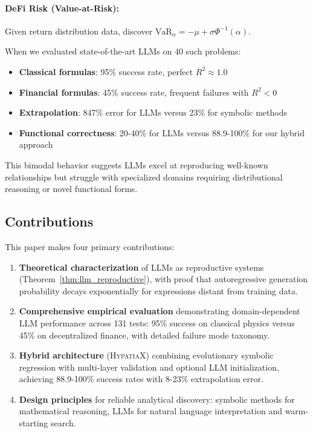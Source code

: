 \documentclass[twoside,11pt]{article}
\begin{document}
\paragraph{DeFi Risk (Value-at-Risk):} Given return distribution data, discover $\text{VaR}_\alpha = -\mu + \sigma \Phi^{-1}(\alpha)$.

When we evaluated state-of-the-art LLMs \citep{openai2023gpt4,anthropic2024claude} on 40 such problems:
\begin{itemize}
\item \textbf{Classical formulas}: 95\% success rate, perfect $R^2 \approx 1.0$
\item \textbf{Financial formulas}: 45\% success rate, frequent failures with $R^2 < 0$
\item \textbf{Extrapolation}: 847\% error for LLMs versus 23\% for symbolic methods\citep{kambhampati2024llms}
\item \textbf{Functional correctness}: 20-40\% for LLMs versus 88\citep{kambhampati2024llms}.9-100\% for our hybrid approach
\end{itemize}

This bimodal behavior suggests LLMs excel at reproducing well-known relationships but struggle with specialized domains requiring distributional reasoning or novel functional forms\citep{kambhampati2024llms}\citep{lewkowycz2022minerva}.

\subsection{Contributions}

This paper makes four primary contributions:

\begin{enumerate}
\item \textbf{Theoretical characterization} of LLMs as reproductive systems (Theorem~\ref{thm:llm_reproductive}), with proof that autoregressive generation probability decays exponentially for expressions distant from training data\citep{kambhampati2024llms}.

\item \textbf{Comprehensive empirical evaluation} demonstrating domain-dependent LLM performance across 131 tests: 95\% success on classical physics versus 45\% on decentralized finance, with detailed failure mode taxonomy\citep{kambhampati2024llms}.

\item \textbf{Hybrid architecture} (\textsc{HypatiaX}) combining evolutionary symbolic regression with multi-layer validation and optional LLM initialization, achieving 88.9-100\% success rates with 8-23\% extrapolation error\citep{la2021contemporary}\citep{kambhampati2024llms}.

\item \textbf{Design principles} for reliable analytical discovery: symbolic methods for mathematical reasoning, LLMs for natural language interpretation and warm-starting search\citep{koza1994genetic}\citep{lewkowycz2022minerva}\citep{kambhampati2024llms}.
\end{enumerate}
\end{document}
